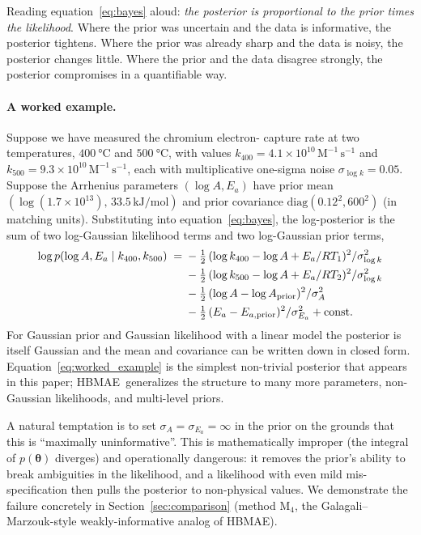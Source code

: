 \documentclass[12pt]{article}
\theoremstyle{plain}
\theoremstyle{definition}
\theoremstyle{remark}
\newcommand{\HBMAE}{HBMAE\xspace}
\begin{document}
Reading equation~\eqref{eq:bayes} aloud: \emph{the posterior is proportional
to the prior times the likelihood}.  Where the prior was uncertain and the
data is informative, the posterior tightens.  Where the prior was already
sharp and the data is noisy, the posterior changes little.  Where the prior
and the data disagree strongly, the posterior compromises in a quantifiable
way.

\paragraph{A worked example.}  Suppose we have measured the chromium electron-
capture rate at two temperatures, $\SI{400}{\celsius}$ and $\SI{500}{\celsius}$,
with values $k_{400} = 4.1\times 10^{10}\,\mathrm{M}^{-1}\,\mathrm{s}^{-1}$ and
$k_{500} = 9.3\times 10^{10}\,\mathrm{M}^{-1}\,\mathrm{s}^{-1}$, each with
multiplicative one-sigma noise $\sigma_{\log k} = 0.05$.  Suppose the Arrhenius
parameters $(\log A, E_a)$ have prior mean $(\log(1.7\times 10^{13}),\,
33.5\,\mathrm{kJ/mol})$ and prior covariance $\mathrm{diag}(0.12^2, 600^2)$
(in matching units).  Substituting into equation~\eqref{eq:bayes}, the
log-posterior is the sum of two log-Gaussian likelihood terms and two
log-Gaussian prior terms,
%
\begin{align}
  \log p(\log A, E_a \mid k_{400}, k_{500}) \;=\;
  &-\tfrac{1}{2}\,(\log k_{400} - \log A + E_a/RT_1)^2/\sigma_{\log k}^2 \notag\\
  &-\tfrac{1}{2}\,(\log k_{500} - \log A + E_a/RT_2)^2/\sigma_{\log k}^2 \notag\\
  &-\tfrac{1}{2}\,(\log A - \log A_{\mathrm{prior}})^2/\sigma_A^2 \notag\\
  &-\tfrac{1}{2}\,(E_a - E_{a,\mathrm{prior}})^2/\sigma_{E_a}^2
  + \mathrm{const}.
  \label{eq:worked_example}
\end{align}
%
For Gaussian prior and Gaussian likelihood with a linear model the posterior
is itself Gaussian and the mean and covariance can be written down in closed
form.  Equation~\eqref{eq:worked_example} is the simplest non-trivial
posterior that appears in this paper; \HBMAE\ generalizes the structure to
many more parameters, non-Gaussian likelihoods, and multi-level priors.

A natural temptation is to set $\sigma_A = \sigma_{E_a} = \infty$ in the
prior on the grounds that this is ``maximally uninformative''.  This is
mathematically improper (the integral of $p(\boldsymbol{\theta})$ diverges)
and operationally dangerous: it removes the prior's ability to break
ambiguities in the likelihood, and a likelihood with even mild
mis-specification then pulls the posterior to non-physical values.  We
demonstrate the failure concretely in Section~\ref{sec:comparison}
(method M$_4$, the Galagali--Marzouk-style weakly-informative analog of
\HBMAE).
\end{document}
